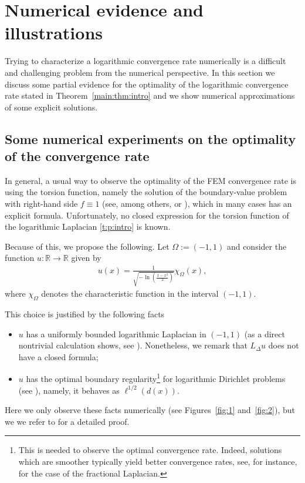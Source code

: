 \documentclass[10 pt]{article}
\numberwithin{equation}{section}
\def\R{\mathbb{R}}
\begin{document}
\section{Numerical evidence and illustrations}\label{sec:numerics}

Trying to characterize a logarithmic convergence rate numerically is a difficult and challenging problem from the numerical perspective. In this section we discuss some partial evidence for the optimality of the logarithmic convergence rate stated in Theorem~\ref{main:thm:intro} and we show numerical approximations of some explicit solutions.

\subsection{Some numerical experiments on the optimality of the convergence rate}

In general, a usual way to observe the optimality of the FEM convergence rate is using the torsion function, namely the solution of the boundary-value problem with right-hand side $f\equiv 1$ (see, among others, \cite[Section 5]{AB17} or \cite[Section 5]{BHS19}), which in many cases has an explicit formula. Unfortunately, no closed expression for the torsion function of the logarithmic Laplacian \eqref{t:p:intro} is known.

Because of this, we propose the following. Let $\Omega:=(-1,1)$ and consider the function $u:\R\to\R$ given by
\begin{align}\label{udef}
 u(x)=\frac{1}{\sqrt{-\ln\left(\frac{1-x^2}{2}\right)}} \chi_{\Omega}(x),
\end{align}
where $\chi_{\Omega}$ denotes the characteristic function in the interval $(-1,1)$.

This choice is justified by the following facts
\begin{itemize}
 \item $u$ has a uniformly bounded logarithmic Laplacian in $(-1,1)$ (as a direct nontrivial calculation shows, see \cite{HSLRS23}). Nonetheless, we remark that $L_{\Delta} u$ does not have a closed formula;
 \item $u$ has the optimal boundary regularity\footnote{This is needed to observe the optimal convergence rate. Indeed, solutions which are smoother typically yield better convergence rates, see, for instance, \cite[Section 5 and Table 2]{AB17} for the case of the fractional Laplacian.} for logarithmic Dirichlet problems (see \cite{HSLRS23}), namely, it behaves as $\ell^{1/2}(d(x))$.
\end{itemize}
Here we only observe these facts numerically (see Figures~\ref{fig:1} and~\ref{fig:2}), but we we refer to \cite{HSLRS23} for a detailed proof. %
\end{document}
